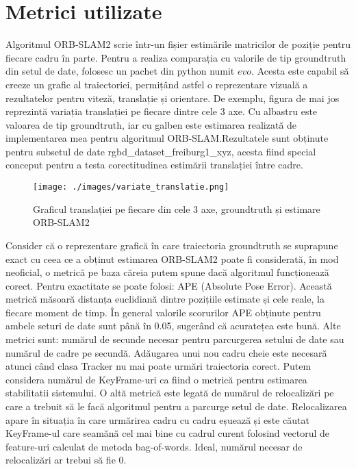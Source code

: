 \documentclass[12pt,a4paper]{report}
\begin{document}
\section{Metrici utilizate}
Algoritmul ORB-SLAM2 scrie într-un fișier estimările matricilor de poziție pentru fiecare 
cadru în parte. Pentru a realiza comparația cu valorile de tip groundtruth din setul de 
date, folosesc un pachet din python numit $ evo $. Acesta este capabil să creeze un grafic
al traiectoriei, permițând astfel o reprezentare vizuală a rezultatelor pentru viteză, 
translație și orientare. De exemplu, figura de mai jos reprezintă variația translației pe 
fiecare dintre cele 3 axe. Cu albastru este valoarea de tip groundtruth, iar cu galben este
estimarea realizată de implementarea mea pentru algoritmul ORB-SLAM.\@ Rezultatele sunt
obținute pentru subsetul de date rgbd\_dataset\_freiburg1\_xyz, acesta fiind special
conceput pentru a testa corectitudinea estimării translației între cadre.
\begin{figure}[htbp] 
  \centering
  \texttt{[image: ./images/variate\_translatie.png]}
  \caption{Graficul translației pe fiecare din cele 3 axe, groundtruth și estimare ORB-SLAM2}\label{fig:translatie}
\end{figure}
Consider că o reprezentare grafică în care traiectoria groundtruth se suprapune exact cu
ceea ce a obținut estimarea ORB-SLAM2 poate fi considerată, în mod neoficial, o metrică
pe baza căreia putem spune dacă algoritmul funcționează corect. Pentru exactitate 
se poate folosi: APE (Absolute Pose Error). Această metrică măsoară distanța euclidiană 
dintre pozițiile estimate și cele reale, la fiecare moment de timp.
În general valorile scorurilor APE obținute pentru ambele seturi de date sunt până în 0.05,
sugerând că acuratețea este bună. Alte metrici sunt: numărul de secunde necesar pentru 
parcurgerea setului de date sau numărul de cadre pe secundă. Adăugarea unui nou cadru cheie este necesară 
atunci când clasa Tracker nu mai poate urmări traiectoria corect. Putem considera numărul de KeyFrame-uri 
ca fiind o metrică pentru estimarea stabilitatii sistemului. O altă metrică este 
legată de numărul de relocalizări pe care a trebuit să le facă algoritmul pentru a parcurge 
setul de date. Relocalizarea apare în situația în care urmărirea cadru cu cadru eșuează și 
este căutat KeyFrame-ul care seamănă cel mai bine cu cadrul curent folosind vectorul de feature-uri 
calculat de metoda bag-of-words. Ideal, numărul necesar de relocalizări ar trebui să fie 0.\\
\end{document}
